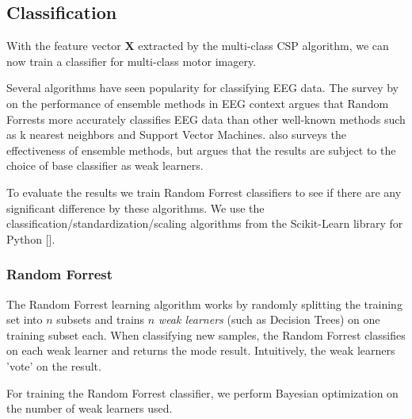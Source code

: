 \subsection{Classification}
With the feature vector $\mathbf{X}$ extracted by the multi-class CSP algorithm, we can now train a classifier for multi-class motor imagery.

Several algorithms have seen popularity for classifying EEG data. The survey by \citet{chan2015systematic} on the performance of ensemble methods in EEG context argues that Random Forrests more accurately classifies EEG data than other well-known methods such as k nearest neighbors and Support Vector Machines. \citet{sun2007experimental} also surveys the effectiveness of ensemble methods, but argues that the results are subject to the choice of base classifier as weak learners.

To evaluate the results we train Random Forrest classifiers to see if there are any significant difference by these algorithms. We use the classification/standardization/scaling algorithms from the Scikit-Learn library for Python [\cite{scikit-learn}].  



\subsubsection{Random Forrest}
The Random Forrest learning algorithm works by randomly splitting the training set into $n$ subsets and trains $n$ \emph{weak learners} (such as Decision Trees) on one training subset each. When classifying new samples, the Random Forrest classifies on each weak learner and returns the mode result. Intuitively, the weak learners 'vote' on the result.

For training the Random Forrest classifier, we perform Bayesian optimization on the number of weak learners used.